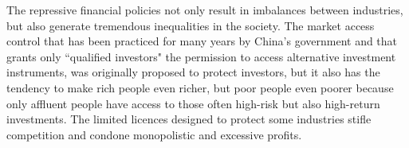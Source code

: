 \documentclass[AER]{AEA}
\begin{document}


The repressive financial policies not only result in imbalances between 
industries, but also generate tremendous inequalities in the society. 
The market access control that has been practiced for many years by China's 
government and that grants only ``qualified investors" the permission 
to access alternative investment instruments, was originally proposed 
to protect investors, but it also has the tendency to make rich people 
even richer, but poor people even poorer because only affluent people 
have access to those often high-risk but also high-return investments. 
The limited licences designed to protect some industries stifle 
competition and condone monopolistic and excessive profits.  \\
\end{document}
